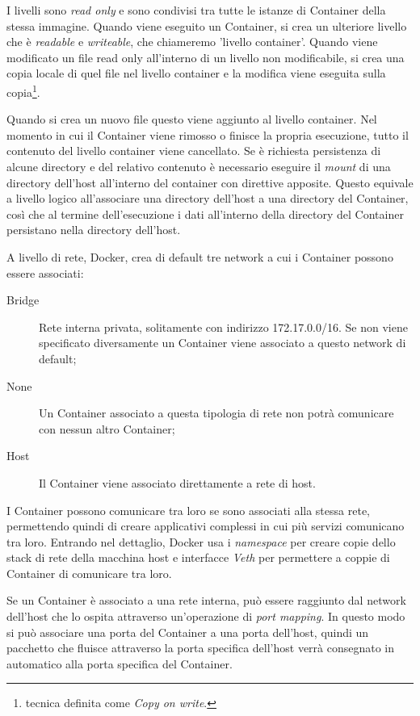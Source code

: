 I livelli sono \textit{read only} e sono condivisi tra tutte le istanze di Container della stessa immagine. Quando viene eseguito un Container, si crea un ulteriore livello che è \textit{readable} e \textit{writeable}, che chiameremo 'livello container'. Quando viene modificato un file read only all'interno di un  livello non modificabile, si crea una copia locale di quel file nel livello container e la modifica viene eseguita sulla  copia\footnote{tecnica definita come \textit{Copy on write}.}.

Quando si crea un nuovo file questo viene aggiunto  al livello container. Nel momento in cui il Container viene rimosso o finisce la propria esecuzione, tutto il contenuto del livello container viene cancellato. Se è richiesta  persistenza di alcune directory  e del relativo contenuto è necessario eseguire il \textit{mount} di una directory dell'host all'interno del container con direttive apposite.  Questo equivale a livello logico all'associare una directory dell'host a una directory del Container, così che al termine dell'esecuzione i dati all'interno della directory del Container persistano nella directory dell'host.

A livello di rete, Docker, crea di default tre network a cui i Container possono essere associati:
\begin{description}
    \item[Bridge] Rete interna privata, solitamente con indirizzo 172.17.0.0/16. Se non viene specificato diversamente un Container viene associato a questo network di default;
    \item[None] Un Container associato a questa tipologia di rete non potrà comunicare con nessun altro Container;
    \item[Host] Il Container viene associato direttamente a rete di host.
\end{description}

I Container possono comunicare tra loro se sono associati alla stessa rete, permettendo quindi di creare applicativi complessi in cui più servizi comunicano tra loro.
Entrando nel dettaglio, Docker usa i \textit{namespace} per creare copie dello stack di rete della macchina host  e interfacce \textit{Veth} per permettere a coppie di Container di comunicare tra loro.

Se un Container è associato a una rete interna, può essere raggiunto dal network dell'host che lo ospita attraverso un'operazione di \textit{port mapping}. In questo modo si può associare una porta del Container a una porta dell'host, quindi un pacchetto che fluisce attraverso la porta specifica dell'host verrà consegnato in automatico alla porta specifica del Container.



